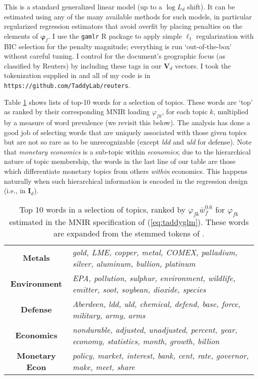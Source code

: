 \documentclass[12pt]{article}
\newcommand{\bs}[1]{\boldsymbol{#1}}
\newcommand{\bm}[1]{\mathbf{#1}}
\begin{document}
This is a standard generalized linear model (up to a $\log L_d$ shift).  It can be estimated using any of the many available methods for such models, in particular regularized regression estimators that avoid overfit by placing penalties on the elements of $\bs{\varphi}_f$.  I use the {\tt gamlr} R package  \citep[implementing the POSE algorithms of][]{taddy_one-step_2015} to apply simple $\ell_1$ regularization  with BIC selection for the penalty magnitude; everything is run `out-of-the-box' without careful tuning.  I control for the document's geographic focus (as classified by Reuters) by including these tags in our $\bm{V}_d$ vectors.  I took the  tokenization supplied in \cite{lewis2004rcv1} and all of my code is in {\tt https://github.com/TaddyLab/reuters}.

Table \ref{wordtab} shows lists of top-10 words for a selection of topics.  These words are `top' as ranked by their corresponding MNIR loading $\varphi_{fk}$, for each topic $k$,  multiplied by a measure of word prevalence (we revisit this below).  The analysis has done a good job of selecting words that are uniquely associated with those given topics but are not so rare as to be unrecognizable (except  {\it ldd} and {\it uld} for defense).  Note that {\it monetary economics} is a sub-topic within {\it economics}; due to the hierarchical nature of topic membership, the words in the last line of our table are those which differentiate monetary topics from others {\it within} economics.  This happens naturally when such hierarchical information is encoded in the regression design (i.e., in $\mathbf{I}_d$).

\begin{table}[ht]\footnotesize
  \begin{tabular}{c|l}
  \bf  Metals & \it gold, LME, copper, metal, COMEX, palladium, silver, aluminum, bullion, platinum \\
 \bf  Environment & \it EPA, pollution, sulphur, environment, wildlife, emitter, soot, soybean, dioxide, species \\
 \bf  Defense & \it Aberdeen, ldd, uld, chemical, defend, base, force, military, army, arms \\
 \bf  Economics & \it nondurable, adjusted, unadjusted, percent, year, economy, statistics, month, growth, billion \\
 \bf  Monetary Econ & \it policy, market, interest, bank, cent, rate, governor, make, meet, share 
 \end{tabular}
 \caption{\label{wordtab} Top 10 words in a selection of topics, ranked by $\varphi_{fk} {\bar w}_f^{0.6}$ for $\varphi_{fk}$ estimated in the MNIR specification of (\ref{eq:taddyglm}). These words are expanded from the stemmed tokens of \cite{lewis2004rcv1}.  }
\end{table}  
\end{document}
